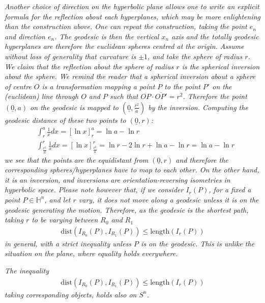 \begin{oss}\label{inequality1}
	\em Another choice of direction on the hyperbolic plane allows one to write an explicit formula for the reflection about each hyperplanes, which may be more enlightening than the construction above. One can repeat the construction, taking the point $e_n$ and direction $e_n$. The geodesic is then the vertical $x_n$ axis and the totally geodesic hyperplanes are therefore the euclidean spheres centred at the origin. Assume without loss of generality that curvature is $\pm 1$, and take the sphere of radius $r$. We claim that the reflection about the sphere of radius $r$ is the spherical inversion about the sphere. We remind the reader that a spherical inversion about a sphere of centre $O$ is a transformation mapping a point $P$ to the point $P'$ on the (euclidean) line through $O$ and $P$ such that $\overline{OP}\cdot \overline{OP'} = r^2$. Therefore the point $(\underline{0}, a)$ on the geodesic is mapped to $(\underline{0}, \frac{r^2}{a})$ by the inversion. Computing the geodesic distance of these two points to  $(\underline{0}, r)$:
	\begin{align*}
		&\int_{r}^{a} \frac{1}{x} dx = \left[\ln{x} \right]_{r}^{a} = \ln{a} - \ln{r} \\
		&\int_{\frac{r^2}{a}}^{r} \frac{1}{x} dx = \left[\ln{x} \right]_{\frac{r^2}{a}}^{r} = \ln{r} - 2 \ln{r} + \ln{a} - \ln{ r} = \ln{a} - \ln{r}
	\end{align*}
	we see that the points are the equidistant from $(\underline{0}, r)$ and therefore the corresponding spheres/hyperplanes have to map to each other. On the other hand, it is an inversion, and inversions are orientation-reversing isometries in hyperbolic space. Please note however that, if we consider $I_r(P)$, for a fixed a point $P\in \mathbb{H}^n$, and let $r$ vary, it does not move along a geodesic unless it is on the geodesic generating the motion. Therefore, as the geodesic is the shortest path, taking $r$ to be varying between $R_0$ and $R_1$
	\begin{align*}
		\mathrm{dist}(I_{R_0}(P), I_{R_1}(P)) \leq \mathrm{length} (I_r(P))
	\end{align*}
	in general, with a strict inequality unless $P$ is on the geodesic. This is unlike the situation on the plane, where equality holds everywhere. 
\end{oss}
\begin{oss}\label{inequality2}
	\em The inequality
	\begin{align}
		\mathrm{dist}(I_{R_0}(P), I_{R_1}(P)) \leq \mathrm{length} (I_r(P))
	\end{align}
	taking corresponding objects, holds also on $S^n$. 
\end{oss}

